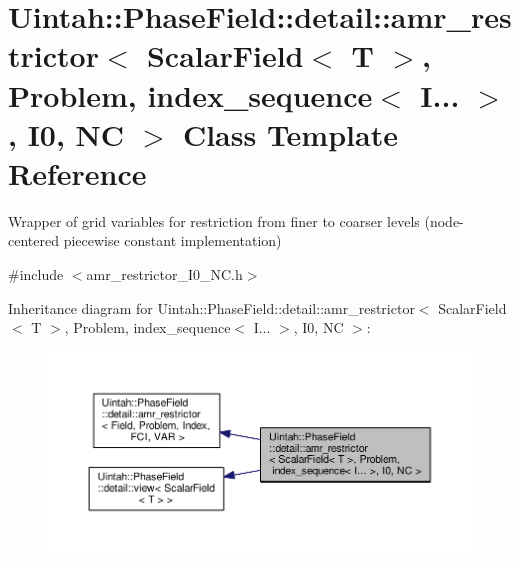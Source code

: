 \hypertarget{classUintah_1_1PhaseField_1_1detail_1_1amr__restrictor_3_01ScalarField_3_01T_01_4_00_01Problem_05760ee5d1d3adcc969b3f56f71e72acb}{}\section{Uintah\+:\+:Phase\+Field\+:\+:detail\+:\+:amr\+\_\+restrictor$<$ Scalar\+Field$<$ T $>$, Problem, index\+\_\+sequence$<$ I... $>$, I0, NC $>$ Class Template Reference}
\label{classUintah_1_1PhaseField_1_1detail_1_1amr__restrictor_3_01ScalarField_3_01T_01_4_00_01Problem_05760ee5d1d3adcc969b3f56f71e72acb}


Wrapper of grid variables for restriction from finer to coarser levels (node-\/centered piecewise constant implementation)  




{\ttfamily \#include $<$amr\+\_\+restrictor\+\_\+\+I0\+\_\+\+N\+C.\+h$>$}



Inheritance diagram for Uintah\+:\+:Phase\+Field\+:\+:detail\+:\+:amr\+\_\+restrictor$<$ Scalar\+Field$<$ T $>$, Problem, index\+\_\+sequence$<$ I... $>$, I0, NC $>$\+:\nopagebreak
\begin{figure}[H]
\begin{center}
\leavevmode
\includegraphics[width=350pt]{classUintah_1_1PhaseField_1_1detail_1_1amr__restrictor_3_01ScalarField_3_01T_01_4_00_01Problem_0df32558d588a2dddebce5cf93a5b29cf}
\end{center}
\end{figure}


